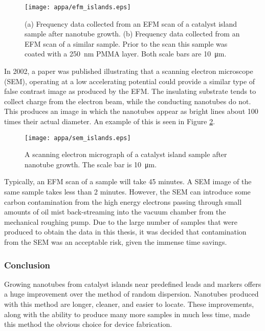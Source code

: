 \begin{figure}
	\centering
	\texttt{[image: appa/efm\_islands.eps]}
	\caption{(a) Frequency data collected from an EFM scan of a catalyst island sample after nanotube growth. (b) Frequency data collected from an EFM scan of a similar sample. Prior to the scan this sample was coated with a \SI{250}{\nano\meter} PMMA layer. Both scale bars are \SI{10}{\micro\meter}. }
	\label{fig:efm_islands}
\end{figure}

In 2002, a paper \cite{Brintlinger2002} was published illustrating that a scanning electron microscope (SEM), operating at a low accelerating potential could provide a similar type of false contrast image as produced by the EFM. The insulating substrate tends to collect charge from the electron beam, while the conducting nanotubes do not. This produces an image in which the nanotubes appear as bright lines about 100 times their actual diameter. An example of this is seen in Figure \ref{fig:sem_islands}. 

\begin{figure}
	\centering
	\texttt{[image: appa/sem\_islands.eps]}
	\caption{A scanning electron micrograph of a catalyst island sample after nanotube growth. The scale bar is \SI{10}{\micro\meter}.}
	\label{fig:sem_islands}
\end{figure}

Typically, an EFM scan of a sample will take 45 minutes. A SEM image of the same sample takes less than 2 minutes. However, the SEM can introduce some carbon contamination from the high energy electrons passing through small amounts of oil mist back-streaming into the vacuum chamber from the mechanical roughing pump. Due to the large number of samples that were produced to obtain the data in this thesis, it was decided that contamination from the SEM was an acceptable risk, given the immense time savings.

\subsubsection{Conclusion}

Growing nanotubes from catalyst islands near predefined leads and markers offers a huge improvement over the method of random dispersion. Nanotubes produced with this method are longer, cleaner, and easier to locate. These improvements, along with the ability to produce many more samples in much less time, made this method the obvious choice for device fabrication.


